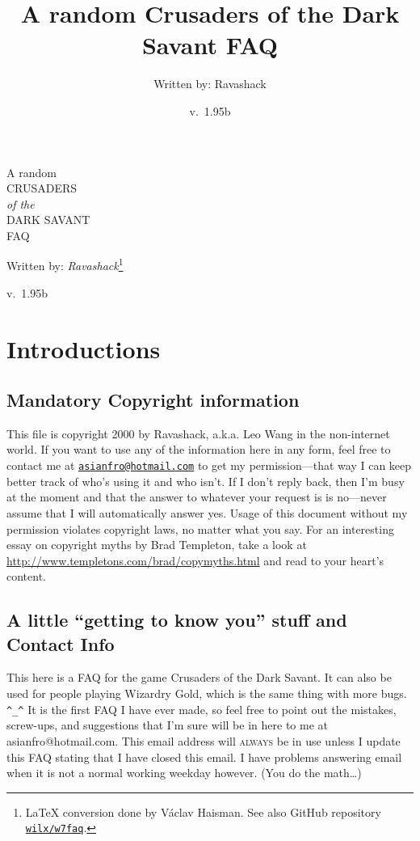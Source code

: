 \documentclass[10pt,twoside,openright]{report}
\title{A random Crusaders of the Dark Savant FAQ}
\author{Written by: Ravashack}
\date{v.\ 1.95b}
\newcommand\textlcsc[1]{\texorpdfstring{\textsc{\MakeLowercase{#1}}}{#1}}
\begin{document}
\begin{titlepage}
  \centering
  {\Huge A random\\\uppercase{Crusaders}\\{\textit{of the}}\\\uppercase{Dark Savant}\\FAQ\par}
  \vspace{1.5cm}
  {\Large Written by: \textit{Ravashack}\protect\footnote{\LaTeX{} conversion done by Václav Haisman.
See also GitHub repository \href{https://github.com/wilx/w7faq}{\texttt{wilx/w7faq}}.}\par}
  \vspace{1.5cm}
  {\large v.\ 1.95b\par}
  \vfill


\end{titlepage}
\mbox{}
\thispagestyle{empty}
\newpage

\chapter*{Introductions}%
%
\section{Mandatory Copyright
information}\label{mandatory-copyright-information}%
%
This file is copyright 2000 by Ravashack, a.k.a. Leo Wang in the non-internet
world. If you want to use any of the information here in any form, feel free
to contact me at
\href{mailto:asianfro@hotmail.com}{\nolinkurl{asianfro@hotmail.com}} to get
my permission---that way I can keep better track of who's using it and who
isn't. If I don't reply back, then I'm busy at the moment and that the answer
to whatever your request is is no---never assume that I will automatically
answer yes. Usage of this document without my permission violates copyright
laws, no matter what you say. For an interesting essay on copyright myths by
Brad Templeton, take a look at
\url{http://www.templetons.com/brad/copymyths.html} and read to your heart's
content.

\section{\texorpdfstring{A little ``getting to know you'' stuff and
Contact
Info}{A little getting to know you stuff and Contact Info}}\label{a-little-getting-to-know-you-stuff-and-contact-info}%
%
This here is a FAQ for the game Crusaders of the Dark Savant. It can also be
used for people playing Wizardry Gold, which is the same thing with more
bugs. \verb|^_^| It is the first FAQ I have ever made, so feel free
to point out the mistakes, screw-ups, and suggestions that I'm sure will be
in here to me at asianfro@hotmail.com. This email address will
\textlcsc{ALWAYS} be in use unless I update this FAQ stating that I have
closed this email. I have problems answering email when it is not a normal
working weekday however. (You do the math\ldots{})
\end{document}
